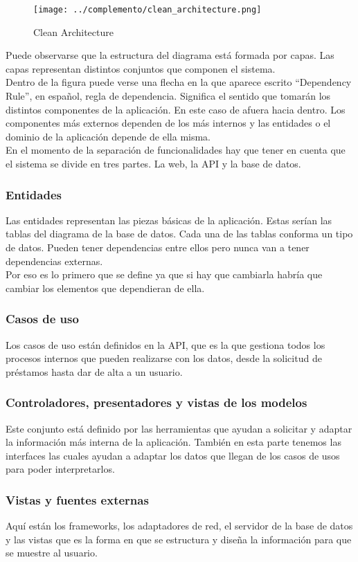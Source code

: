\begin{figure}[ht]
    \texttt{[image: ../complemento/clean\_architecture.png]}
    \caption{Clean Architecture}\label{clean_architecture_diagram}
\end{figure}

Puede observarse que la estructura del diagrama está formada por capas. Las capas representan distintos conjuntos que componen el sistema.
\\Dentro de la figura puede verse una flecha en la que aparece escrito ``Dependency Rule'', en español, regla de dependencia. Significa el sentido que tomarán los distintos componentes de la aplicación. En este caso de afuera hacia dentro. Los componentes más externos dependen de los más internos y las entidades o el dominio de la aplicación depende de ella misma.
\\En el momento de la separación de funcionalidades hay que tener en cuenta que el sistema se divide en tres partes. La web, la API y la base de datos.

\subsubsection{Entidades}
Las entidades representan las piezas básicas de la aplicación. Estas serían las tablas del diagrama de la base de datos. Cada una de las tablas conforma un tipo de datos. Pueden tener dependencias entre ellos pero nunca van a tener dependencias externas.
\\Por eso es lo primero que se define ya que si hay que cambiarla habría que cambiar los elementos que dependieran de ella.

\subsubsection{Casos de uso}
Los casos de uso están definidos en la API, que es la que gestiona todos los procesos internos que pueden realizarse con los datos, desde la solicitud de préstamos hasta dar de alta a un usuario.

\subsubsection{Controladores, presentadores y vistas de los modelos}
Este conjunto está definido por las herramientas que ayudan a solicitar y adaptar la información más interna de la aplicación. También en esta parte tenemos las interfaces las cuales ayudan a adaptar los datos que llegan de los casos de usos para poder interpretarlos.

\subsubsection{Vistas y fuentes externas}
Aquí están los frameworks, los adaptadores de red, el servidor de la base de datos y las vistas que es la forma en que se estructura y diseña la información para que se muestre al usuario.